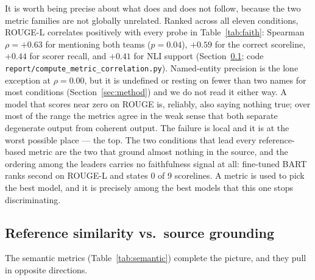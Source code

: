 \documentclass[10pt,a4paper]{article}
\begin{document}
It is worth being precise about what does and does not follow, because the two metric families are not globally unrelated. Ranked across all eleven conditions, ROUGE-L correlates positively with every probe in Table~\ref{tab:faith}: Spearman $\rho = +0.63$ for mentioning both teams ($p = 0.04$), $+0.59$ for the correct scoreline, $+0.44$ for scorer recall, and $+0.41$ for NLI support (Section~\ref{sec:semantic}; code \texttt{report/compute\_metric\_correlation.py}). Named-entity precision is the lone exception at $\rho = 0.00$, but it is undefined or resting on fewer than two names for most conditions (Section~\ref{sec:method}) and we do not read it either way. A model that scores near zero on ROUGE is, reliably, also saying nothing true; over most of the range the metrics agree in the weak sense that both separate degenerate output from coherent output. The failure is local and it is at the worst possible place --- the top. The two conditions that lead every reference-based metric are the two that ground almost nothing in the source, and the ordering among the leaders carries no faithfulness signal at all: fine-tuned BART ranks second on ROUGE-L and states 0 of 9 scorelines. A metric is used to pick the best model, and it is precisely among the best models that this one stops discriminating.

\subsection{Reference similarity vs.\ source grounding}
\label{sec:semantic}

The semantic metrics (Table~\ref{tab:semantic}) complete the picture, and they pull in opposite directions.
\end{document}
